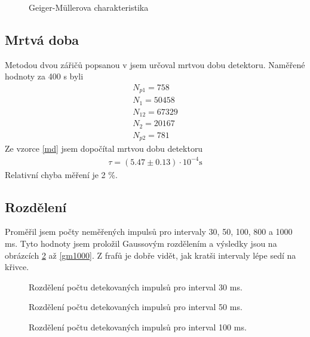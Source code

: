\documentclass[a4paper,12pt]{article}
\begin{document}
\begin{figure}
\begin{center}

\end{center}
\caption{Geiger-Müllerova charakteristika}
\label{g1}
\end{figure}

\subsection{Mrtvá doba}
Metodou dvou zářičů popsanou v \cite{text} jsem určoval mrtvou dobu detektoru. 
Naměřené hodnoty za 400 s byli
\begin{eqnarray}
N_{p1}=758\\
N_1=50458\\
N_{12}=67329\\
N_2=20167\\
N_{p2}=781
\end{eqnarray}
Ze vzorce \ref{md} jsem dopočítal mrtvou dobu detektoru
\begin{eqnarray}
\tau=(5.47\pm 0.13)\cdot 10^{-4} \mbox{s}
\end{eqnarray}
Relativní chyba měření je 2 \%.

\subsection{Rozdělení}
Proměřil jsem počty neměřených impulsů pro intervaly 30, 50, 100, 800 a 1000 ms. 
Tyto hodnoty jsem proložil Gaussovým rozdělením a výsledky jsou na obrázcích 
\ref{gm30} až \ref{gm1000}. Z frafů je dobře vidět, jak kratši intervaly lépe sedí 
na křivce.

\begin{figure}
\begin{center}

\end{center}
\caption{Rozdělení počtu detekovaných impulsů pro interval 30 ms.}
\label{gm30}
\end{figure}

\begin{figure}
\begin{center}

\end{center}
\caption{Rozdělení počtu detekovaných impulsů pro interval 50 ms.}
\label{gm50}
\end{figure}

\begin{figure}
\begin{center}

\end{center}
\caption{Rozdělení počtu detekovaných impulsů pro interval 100 ms.}
\label{gm100}
\end{figure}
\end{document}

